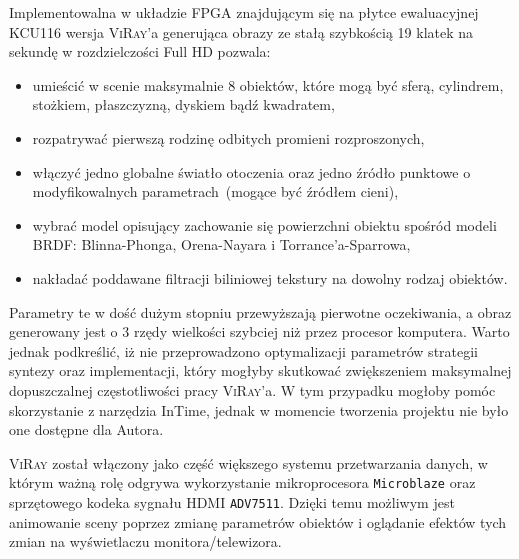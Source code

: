 Implementowalna w układzie FPGA znajdującym się na płytce ewaluacyjnej KCU116 wersja \textsc{ViRay}'a generująca obrazy ze stałą szybkością 19 klatek na sekundę w rozdzielczości Full HD pozwala:
\begin{itemize}
\item umieścić w scenie maksymalnie 8 obiektów, które mogą być sferą, cylindrem, stożkiem, płaszczyzną, dyskiem bądź kwadratem,
\item rozpatrywać pierwszą rodzinę odbitych promieni rozproszonych,
\item włączyć jedno globalne światło otoczenia oraz jedno źródło punktowe o modyfikowalnych parametrach~(mogące być źródłem cieni),
\item wybrać model opisujący zachowanie się powierzchni obiektu spośród modeli BRDF: Blinna-Phonga, Orena-Nayara i Torrance'a-Sparrowa,
\item nakładać poddawane filtracji biliniowej tekstury na dowolny rodzaj obiektów.
\end{itemize}
Parametry te w dość dużym stopniu przewyższają pierwotne oczekiwania, a obraz generowany jest o 3 rzędy wielkości szybciej niż przez procesor komputera. Warto jednak podkreślić, iż nie przeprowadzono optymalizacji parametrów strategii syntezy oraz implementacji, który mogłyby skutkować zwiększeniem maksymalnej dopuszczalnej częstotliwości pracy \textsc{ViRay}'a. W tym przypadku mogłoby pomóc skorzystanie z narzędzia InTime, jednak w momencie tworzenia projektu nie było one dostępne dla Autora.

\textsc{ViRay} został włączony jako część większego systemu przetwarzania danych, w którym ważną rolę odgrywa wykorzystanie mikroprocesora \texttt{Microblaze} oraz sprzętowego kodeka sygnału HDMI \texttt{ADV7511}. Dzięki temu możliwym jest animowanie sceny poprzez zmianę parametrów obiektów i oglądanie efektów tych zmian na wyświetlaczu monitora/telewizora.




%

